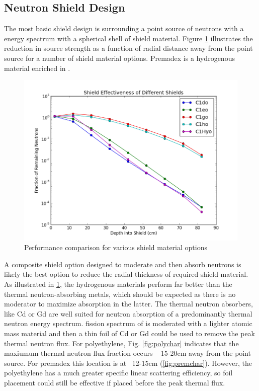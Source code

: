 \documentclass{mc2015}
\begin{document}
\subsection{Neutron Shield Design}

The most basic shield design is surrounding a point source of neutrons with a  energy spectrum with a spherical shell of shield material. Figure \ref{fig:basics} illustrates the reduction in source strength as a function of radial distance away from the point source for a number of shield material options. Premadex is a hydrogenous material enriched in . 

\begin{figure}[H]
  \centering
  \includegraphics[width=4.5in]{Basics.png}
  \caption{Performance comparison for various shield material options}
  \label{fig:basics}
\end{figure}

A composite shield option designed to moderate and then absorb neutrons is likely the best option to reduce the radial thickness of required shield material. As illustrated in \ref{fig:basics}, the hydrogenous materials perform far better than the thermal neutron-absorbing metals, which should be expected as there is no moderator to maximize absorption in the latter. The thermal neutron absorbers, like Cd or Gd are well suited for neutron absorption of a predominantly thermal neutron energy spectrum.  fission spectrum of  is moderated with a lighter atomic mass material and then a thin foil of Cd or Gd could be used to remove the peak thermal neutron flux. For polyethylene, Fig. \ref{fig:polychar} indicates that the maxiumum thermal neutron flux fraction occurs ~ 15-20cm away from the point source. For premadex this location is at ~12-15cm (\ref{fig:premchar}). However, the polyethylene has a much greater specific linear scattering efficiency, so foil placement could still be effective if placed before the peak thermal flux. 
\end{document}
